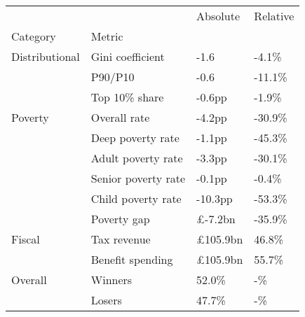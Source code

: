 \begin{tabular}{llll}
\toprule
        &        &  Absolute & Relative \\
Category & Metric &           &          \\
\midrule
Distributional & Gini coefficient &      -1.6 &    -4.1\% \\
        & P90/P10 &      -0.6 &   -11.1\% \\
        & Top 10\% share &    -0.6pp &    -1.9\% \\
Poverty & Overall rate &    -4.2pp &   -30.9\% \\
        & Deep poverty rate &    -1.1pp &   -45.3\% \\
        & Adult poverty rate &    -3.3pp &   -30.1\% \\
        & Senior poverty rate &    -0.1pp &    -0.4\% \\
        & Child poverty rate &   -10.3pp &   -53.3\% \\
        & Poverty gap &   £-7.2bn &   -35.9\% \\
Fiscal & Tax revenue &  £105.9bn &    46.8\% \\
        & Benefit spending &  £105.9bn &    55.7\% \\
Overall & Winners &     52.0\% &       -\% \\
        & Losers &     47.7\% &       -\% \\
\bottomrule
\end{tabular}
